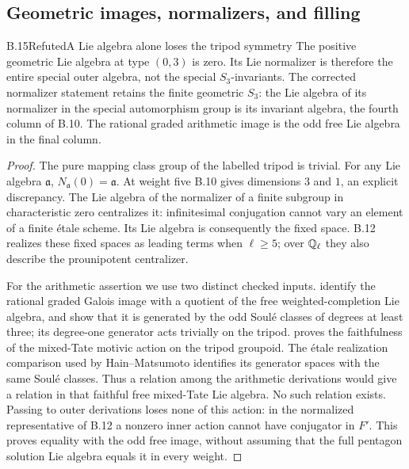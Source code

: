 




\subsection{Geometric images, normalizers, and filling}

\begin{statement}{B.15}{Refuted}{A Lie algebra alone loses the tripod symmetry}
The positive geometric Lie algebra at type $(0,3)$ is zero.
Its Lie normalizer is therefore the entire special outer
algebra, not the special $S_3$-invariants. The corrected
normalizer statement retains the finite geometric $S_3$:
the Lie algebra of its normalizer in the special
automorphism group is its invariant algebra, the fourth
column of B.10. The rational graded arithmetic image is
the odd free Lie algebra in the final column.
\end{statement}
\begin{proof}
The pure mapping class group of the labelled tripod is
trivial. For any Lie algebra $\mathfrak a$,
$N_{\mathfrak a}(0)=\mathfrak a$. At weight five B.10
gives dimensions $3$ and $1$, an explicit discrepancy.
The Lie algebra of the normalizer of a finite subgroup in
characteristic zero centralizes it: infinitesimal
conjugation cannot vary an element of a finite étale
scheme. Its Lie algebra is consequently the fixed space.
B.12 realizes these fixed spaces as leading terms when
$\ell\ge5$; over $\mathbb Q_\ell$ they also describe the
prounipotent centralizer.

For the arithmetic assertion we use two distinct checked
inputs. \citet[Theorem 8.4, Theorem 7.3 and Lemma 8.5]{HainMatsumoto2003}
identify the rational graded Galois image with a quotient
of the free weighted-completion Lie algebra, and show
that it is generated by the odd Soulé classes of degrees
at least three; its degree-one generator acts trivially
on the tripod. \citet[Theorem 1.1 and the deduction of
Conjecture 1 in the introduction]{Brown2012} proves the
faithfulness of the mixed-Tate motivic action on the
tripod groupoid. The étale realization comparison used
by Hain--Matsumoto identifies its generator spaces with
the same Soulé classes. Thus a relation among the
arithmetic derivations would give a relation in that
faithful free mixed-Tate Lie algebra. No such relation
exists. Passing to outer derivations loses none of this
action: in the normalized representative of B.12 a
nonzero inner action cannot have conjugator in $F'$.
This proves equality with the odd free image, without
assuming that the full pentagon solution Lie algebra
equals it in every weight.
\end{proof}

